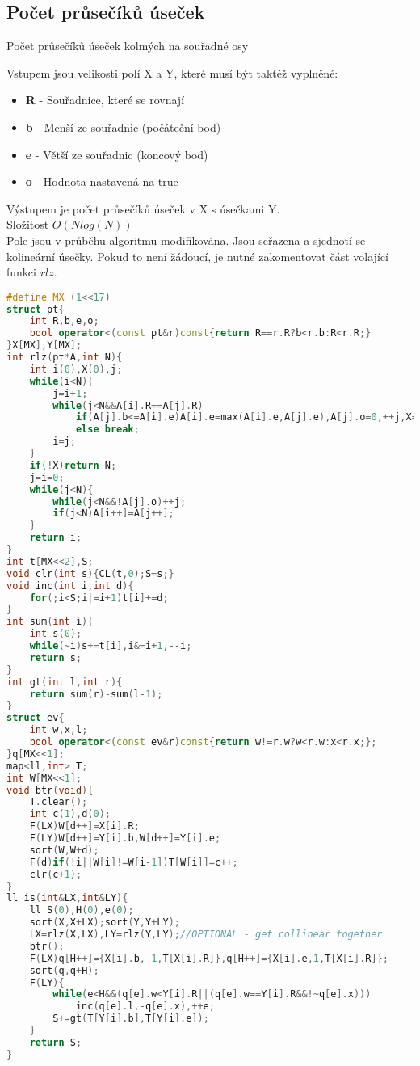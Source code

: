 \documentclass[11pt]{article}
\begin{document}
\subsection{Počet průsečíků úseček}
\begin{center}
Počet průsečíků úseček kolmých na souřadné osy
\end{center}
Vstupem jsou velikosti polí \textsf{X} a \textsf{Y}, které musí být taktéž vyplněné:
\begin{itemize}
\item \textbf{R} - Souřadnice, které se rovnají
\item \textbf{b} - Menší ze souřadnic (počáteční bod)
\item \textbf{e} - Větší ze souřadnic (koncový bod)
\item \textbf{o} - Hodnota nastavená na true
\end{itemize}
Výstupem je počet průsečíků úseček v \textsf{X} s úsečkami \textsf{Y}.
\\Složitost $O(Nlog(N))$
\\Pole jsou v průběhu algoritmu modifikována. Jsou seřazena a sjednotí se kolineární úsečky. Pokud to není žádoucí, je nutné zakomentovat část volající funkci $rlz$.
\begin{lstlisting}[language=C++]
#define MX (1<<17)
struct pt{
    int R,b,e,o;
    bool operator<(const pt&r)const{return R==r.R?b<r.b:R<r.R;}
}X[MX],Y[MX];
int rlz(pt*A,int N){
    int i(0),X(0),j;
    while(i<N){
        j=i+1;
        while(j<N&&A[i].R==A[j].R)
            if(A[j].b<=A[i].e)A[i].e=max(A[i].e,A[j].e),A[j].o=0,++j,X=1;
            else break;
        i=j;
    }
    if(!X)return N;
    j=i=0;
    while(j<N){
        while(j<N&&!A[j].o)++j;
        if(j<N)A[i++]=A[j++];
    }
    return i;
}
int t[MX<<2],S;
void clr(int s){CL(t,0);S=s;}
void inc(int i,int d){
    for(;i<S;i|=i+1)t[i]+=d;
}
int sum(int i){
    int s(0);
    while(~i)s+=t[i],i&=i+1,--i;
    return s;
}
int gt(int l,int r){
    return sum(r)-sum(l-1);
}
struct ev{
    int w,x,l;
    bool operator<(const ev&r)const{return w!=r.w?w<r.w:x<r.x;};
}q[MX<<1];
map<ll,int> T;
int W[MX<<1];
void btr(void){
    T.clear();
    int c(1),d(0);
    F(LX)W[d++]=X[i].R;
    F(LY)W[d++]=Y[i].b,W[d++]=Y[i].e;
    sort(W,W+d);
    F(d)if(!i||W[i]!=W[i-1])T[W[i]]=c++;
    clr(c+1);
}
ll is(int&LX,int&LY){
    ll S(0),H(0),e(0);
    sort(X,X+LX);sort(Y,Y+LY);
    LX=rlz(X,LX),LY=rlz(Y,LY);//OPTIONAL - get collinear together
    btr();
    F(LX)q[H++]={X[i].b,-1,T[X[i].R]},q[H++]={X[i].e,1,T[X[i].R]};
    sort(q,q+H);
    F(LY){
        while(e<H&&(q[e].w<Y[i].R||(q[e].w==Y[i].R&&!~q[e].x)))
            inc(q[e].l,-q[e].x),++e;
        S+=gt(T[Y[i].b],T[Y[i].e]);
    }
    return S;
}
\end{lstlisting}
\end{document}
